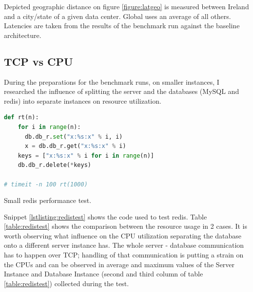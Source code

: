 \documentclass{uvamscse}
\begin{document}
Depicted geographic distance on figure \ref{figure:latgeo} is measured between Ireland and a city/state of a given data center. Global uses an average of all others. Latencies are taken from the results of the benchmark run against the baseline architecture.

\subsection{TCP vs CPU}
During the preparations for the benchmark runs, on smaller instances, I researched the influence  of splitting the server and the databases (MySQL and redis) into separate instances on resource utilization.

\begin{sourcecode}[h]
\begin{lstlisting}[style=mono,language=python]
def rt(n):
    for i in range(n):
      db.db_r.set("x:%s:x" % i, i)
      x = db.db_r.get("x:%s:x" % i)
    keys = ["x:%s:x" % i for i in range(n)]
    db.db_r.delete(*keys)

# timeit -n 100 rt(1000)
\end{lstlisting}
\caption{Small redis performance test.}
\label{lstlisting:redistest}
\end{sourcecode}

Snippet \ref{lstlisting:redistest} shows the code used to test redis. Table \ref{table:redistest} shows the comparison between the resource usage in 2 cases. It is worth observing what influence on the CPU utilization separating the database onto a different server instance has. The whole server - database communication has to happen over TCP; handling of that communication is putting a  strain on the CPUs and can be observed in average and maximum values of the Server Instance and Database Instance (second and third column of table \ref{table:redistest}) collected during the test.
\end{document}
